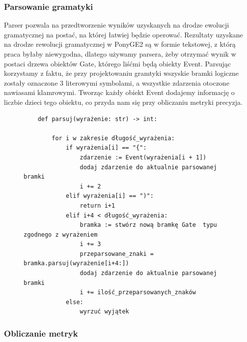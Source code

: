 \subsubsection{Parsowanie gramatyki}
Parser pozwala na przedtworzenie wyników uzyskanych na drodze ewolucji gramatycznej na postać, na której łatwiej będzie operować. Rezultaty uzyskane na drodze rewolucji gramatycznej w PonyGE2 są w formie tekstowej, z którą praca byłaby niewygodna, dlatego używamy parsera, żeby otrzymać wynik w postaci drzewa obiektów Gate, którego liśćmi będą obiekty Event.
Parsując korzystamy z faktu, że przy projektowaniu gramtyki wszyskie bramki logiczne zostały oznaczone 3 literowymi symbolami, a wszystkie zdarzenia otoczone nawiasami klamrowymi. Tworząc każdy obiekt Event dodajemy informację o liczbie dzieci tego obiektu, co przyda nam się przy obliczaniu metryki precyzja.
\begin{figure}[!ht]
\lstset{caption=Parser gramatyki, captionpos=b}
\lstset{label=src:passive, frame=single}
\begin{lstlisting}
    def parsuj(wyrażenie: str) -> int:

        for i w zakresie długość_wyrażenia:
            if wyrażenia[i] == "{":
                zdarzenie := Event(wyrażenia[i + 1])
                dodaj zdarzenie do aktualnie parsowanej bramki 
                i += 2
            elif wyrażenia[i] == ")":
                return i+1
            elif i+4 < długość_wyrażenia:
                bramka := stwórz nową bramkę Gate  typu zgodnego z wyrażeniem 
                i += 3
                przeparsowane_znaki = bramka.parsuj(wyrażenie[i+4:])
                dodaj zdarzenie do aktualnie parsowanej bramki 
                i += ilość_przeparsowanych_znaków
            else:
                wyrzuć wyjątek
\end{lstlisting}
\end{figure}

\subsubsection{Obliczanie metryk}

